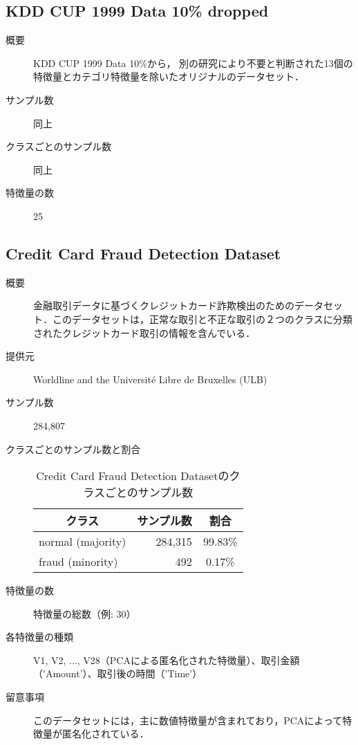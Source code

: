 \subsection{KDD CUP 1999 Data 10\% dropped}
\begin{description}
    \item[概要] KDD CUP 1999 Data 10\%から， 別の研究\cite{thesis1}により不要と判断された13個の特徴量とカテゴリ特徴量を除いたオリジナルのデータセット．
    \item[サンプル数] 同上
    \item[クラスごとのサンプル数] 同上
    \item[特徴量の数] 25 
\end{description}

\subsection{Credit Card Fraud Detection Dataset}
\begin{description}
    \item[概要] 金融取引データに基づくクレジットカード詐欺検出のためのデータセット．このデータセットは，正常な取引と不正な取引の２つのクラスに分類されたクレジットカード取引の情報を含んでいる．
    \item[提供元] Worldline and the Université Libre de Bruxelles (ULB)\cite{CreditCardFraudDetectionDataset}
    \item[サンプル数] 284,807
    \item[クラスごとのサンプル数と割合] \mbox{}
        \begin{table}[htbp]
            \centering
            \caption{Credit Card Fraud Detection Datasetのクラスごとのサンプル数}
                \label{tab:creditcardfrauddetectiondataset}
                \begin{tabular}{lrc} \hline
                    \multicolumn{1}{c}{クラス}&
                    \multicolumn{1}{c}{サンプル数}&
                    \multicolumn{1}{c}{割合}\\
                    \hline
                    \hline
                    normal  (majority)& 284,315 & 99.83\% \\
                    fraud (minority)& 492 & 0.17\% \\
                    \hline
                \end{tabular}
        \end{table}
    \item[特徴量の数] 特徴量の総数（例: 30）
    \item[各特徴量の種類] \mbox{}
            V1, V2, ..., V28（PCAによる匿名化された特徴量）、取引金額（'Amount'）、取引後の時間（'Time'）
    \item[留意事項] このデータセットには，主に数値特徴量が含まれており，PCAによって特徴量が匿名化されている．
\end{description}


